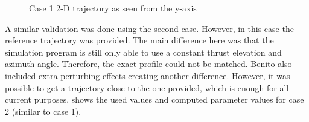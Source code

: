 


\begin{figure}[H]
\centering
\caption{Case 1 2-D trajectory as seen from the y-axis}
\label{fig:PlotFigure1SeenFromZoomYaxis}
\end{figure}




\noindent
A similar validation was done using the second case. However, in this case the reference trajectory was provided. The main difference here was that the simulation program is still only able to use a constant thrust elevation and azimuth angle. Therefore, the exact profile could not be matched. Benito also included extra perturbing effects creating another difference. However, it was possible to get a trajectory close to the one provided, which is enough for all current purposes.  shows the used values and computed parameter values for case 2 (similar to case 1).  




